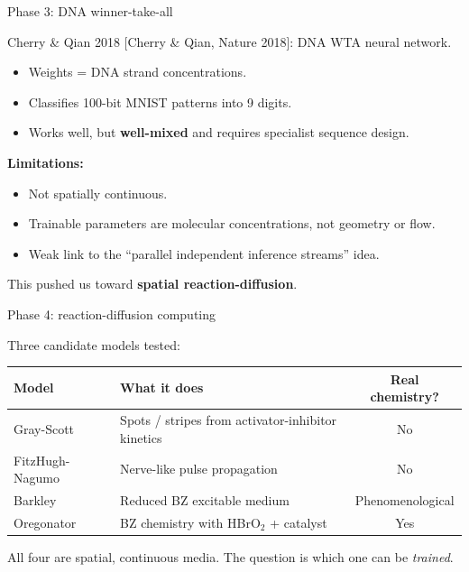 \documentclass[aspectratio=169,11pt]{beamer}
\newcommand{\citeslide}[1]{\hfill{\footnotesize [#1]}}
\begin{document}
\begin{frame}{Phase 3: DNA winner-take-all}

Cherry \& Qian 2018 \citeslide{Cherry \& Qian, Nature 2018}: DNA WTA neural network.

\vspace{0.2cm}
\begin{itemize}
    \item Weights = DNA strand concentrations.
    \item Classifies 100-bit MNIST patterns into 9 digits.
    \item Works well, but \textbf{well-mixed} and requires specialist sequence design.
\end{itemize}

\vspace{0.3cm}
\textbf{Limitations:}
\begin{itemize}
    \item Not spatially continuous.
    \item Trainable parameters are molecular concentrations, not geometry or flow.
    \item Weak link to the ``parallel independent inference streams'' idea.
\end{itemize}

\vspace{0.2cm}
\centering
This pushed us toward \textbf{spatial reaction-diffusion}.

\end{frame}

\begin{frame}{Phase 4: reaction-diffusion computing}

Three candidate models tested:

\vspace{0.3cm}
\begin{table}
\centering
\footnotesize
\begin{tabular}{p{2.8cm}p{5.5cm}c}
\toprule
\textbf{Model} & \textbf{What it does} & \textbf{Real chemistry?} \\
\midrule
Gray-Scott & Spots / stripes from activator-inhibitor kinetics & No \\
FitzHugh-Nagumo & Nerve-like pulse propagation & No \\
Barkley & Reduced BZ excitable medium & Phenomenological \\
Oregonator & BZ chemistry with HBrO$_2$ + catalyst & Yes \\
\bottomrule
\end{tabular}
\end{table}

\vspace{0.3cm}
\centering
All four are spatial, continuous media. The question is which one can be \textit{trained}.

\end{frame}
\end{document}
